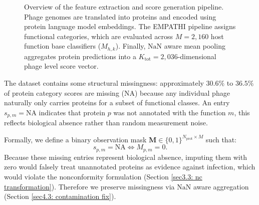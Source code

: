 \begin{figure}[htbp]
\caption{Overview of the feature extraction and score generation pipeline. Phage genomes are translated into proteins and encoded using 
protein language model embeddings. The EMPATHI pipeline assigns functional categories, which are evaluated across $M = 2{,}160$ host 
function base classifiers ($M_{h,k}$). Finally, $\text{NaN}$ aware mean pooling aggregates protein predictions into a $K_{\text{tot}} 
= 2{,}036$-dimensional phage level score vector.}
\label{fig:data_generation_pipeline}
\end{figure}



The dataset contains some structural missingness: approximately $30.6\%$ to $36.5\%$ of protein category scores are missing 
($\mathrm{NA}$) because any individual phage naturally only carries proteins for a subset of functional classes. An entry $s_{p,m} 
= \mathrm{NA}$ indicates that protein $p$ was not annotated with the function $m$, this reflects biological absence rather than 
random measurement noise.

Formally, we define a binary observation mask $\mathbf{M} \in \{0,1\}^{N_{\text{prot}} \times M}$ such that:
\begin{equation}
\label{eq: structural-missingness}
s_{p,m} = \text{NA} \iff M_{p,m} = 0.
\end{equation}
Because these missing entries represent biological absence, imputing them with zero would falsely treat unannotated proteins as 
evidence against infection, which would violate the nonconformity formulation (Section \ref{sec3.3: nc transformation}). Therefore 
we preserve missingness via $\mathrm{NaN}$ aware aggregation (Section \ref{sec4.3: contamination fix}).

